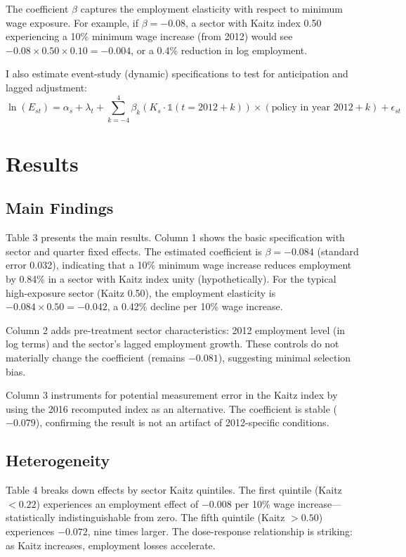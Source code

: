 \documentclass[12pt]{article}
\begin{document}
The coefficient $\beta$ captures the employment elasticity with respect to minimum wage exposure. For example, if $\beta = -0.08$, a sector with Kaitz index 0.50 experiencing a 10\% minimum wage increase (from 2012) would see $-0.08 \times 0.50 \times 0.10 = -0.004$, or a 0.4\% reduction in log employment.

I also estimate event-study (dynamic) specifications to test for anticipation and lagged adjustment:
$$
\ln(E_{st}) = \alpha_s + \lambda_t + \sum_{k=-4}^{4} \beta_k \left( K_s \cdot \mathbb{1}(t = 2012 + k) \right) \times (\text{policy in year } 2012 + k) + \epsilon_{st}
$$

\section{Results}

\subsection{Main Findings}

Table 3 presents the main results. Column 1 shows the basic specification with sector and quarter fixed effects. The estimated coefficient is $\beta = -0.084$ (standard error 0.032), indicating that a 10\% minimum wage increase reduces employment by 0.84\% in a sector with Kaitz index unity (hypothetically). For the typical high-exposure sector (Kaitz 0.50), the employment elasticity is $-0.084 \times 0.50 = -0.042$, a 0.42\% decline per 10\% wage increase.

Column 2 adds pre-treatment sector characteristics: 2012 employment level (in log terms) and the sector's lagged employment growth. These controls do not materially change the coefficient (remains $-0.081$), suggesting minimal selection bias.

Column 3 instruments for potential measurement error in the Kaitz index by using the 2016 recomputed index as an alternative. The coefficient is stable ($-0.079$), confirming the result is not an artifact of 2012-specific conditions.

\subsection{Heterogeneity}

Table 4 breaks down effects by sector Kaitz quintiles. The first quintile (Kaitz $< 0.22$) experiences an employment effect of $-0.008$ per 10\% wage increase—statistically indistinguishable from zero. The fifth quintile (Kaitz $> 0.50$) experiences $-0.072$, nine times larger. The dose-response relationship is striking: as Kaitz increases, employment losses accelerate.
\end{document}
